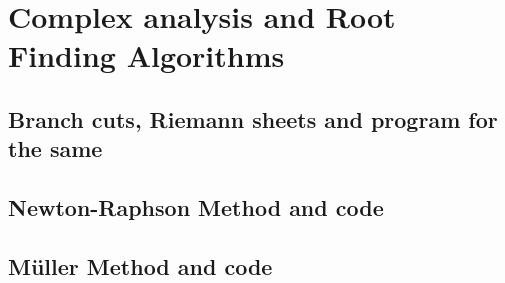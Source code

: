 \documentclass[]{report}
\begin{document}
	
	\tableofcontents
	\chapter{Complex analysis and Root Finding Algorithms}
	\section*{Branch cuts, Riemann sheets and program for the same}
	\section*{Newton-Raphson Method and code}
	\cite{Mizera2024} \cite{Antia2012}
	\section*{M{\"u}ller Method and code }
	
	
	
\end{document}
